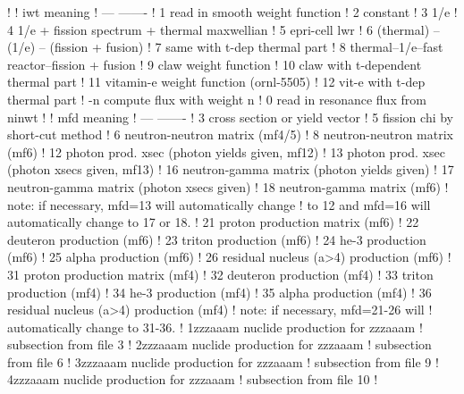\begin{ccode}
   !
   !     iwt          meaning
   !     ---          -------
   !      1           read in smooth weight function
   !      2           constant
   !      3           1/e
   !      4           1/e + fission spectrum + thermal maxwellian
   !      5           epri-cell lwr
   !      6           (thermal) -- (1/e) -- (fission + fusion)
   !      7           same with t-dep thermal part
   !      8           thermal--1/e--fast reactor--fission + fusion
   !      9           claw weight function
   !     10           claw with t-dependent thermal part
   !     11           vitamin-e weight function (ornl-5505)
   !     12           vit-e with t-dep thermal part
   !     -n           compute flux with weight n
   !      0           read in resonance flux from ninwt
   !
   !     mfd          meaning
   !     ---          -------
   !      3           cross section or yield vector
   !      5           fission chi by short-cut method
   !      6           neutron-neutron matrix (mf4/5)
   !      8           neutron-neutron matrix (mf6)
   !     12           photon prod. xsec (photon yields given, mf12)
   !     13           photon prod. xsec (photon xsecs given, mf13)
   !     16           neutron-gamma matrix (photon yields given)
   !     17           neutron-gamma matrix (photon xsecs given)
   !     18           neutron-gamma matrix (mf6)
   !         note: if necessary, mfd=13 will automatically change
   !         to 12 and mfd=16 will automatically change to 17 or 18.
   !     21           proton production matrix (mf6)
   !     22           deuteron production (mf6)
   !     23           triton production (mf6)
   !     24           he-3 production (mf6)
   !     25           alpha production (mf6)
   !     26           residual nucleus (a>4) production (mf6)
   !     31           proton production matrix (mf4)
   !     32           deuteron production (mf4)
   !     33           triton production (mf4)
   !     34           he-3 production (mf4)
   !     35           alpha production (mf4)
   !     36           residual nucleus (a>4) production (mf4)
   !          note: if necessary, mfd=21-26 will
   !          automatically change to 31-36.
   !    1zzzaaam       nuclide production for zzzaaam
   !                     subsection from file 3
   !    2zzzaaam       nuclide production for zzzaaam
   !                     subsection from file 6
   !    3zzzaaam       nuclide production for zzzaaam
   !                     subsection from file 9
   !    4zzzaaam       nuclide production for zzzaaam
   !                     subsection from file 10
   !

\end{ccode}
